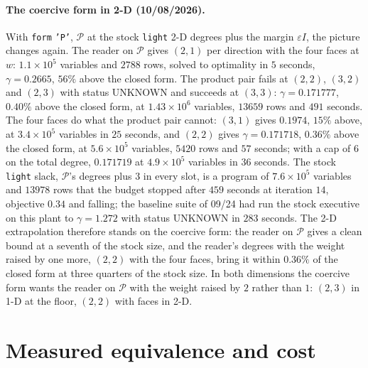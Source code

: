 \documentclass[12pt]{article}
\newcommand{\mcl}[1]{\mathcal{#1}}
\newcommand{\code}[1]{\texttt{#1}}
\theoremstyle{plain}
\theoremstyle{definition}
\theoremstyle{remark}
\begin{document}
\paragraph{The coercive form in 2-D (10/08/2026).} With \code{form} \code{'P'}, $\mcl P$ at the stock \code{light} 2-D degrees plus the margin $\varepsilon I$, the picture changes again. The reader on $\mcl P$ gives $(2,1)$ per direction with the four faces at $w$: $1.1\times10^{5}$ variables and $2788$ rows, solved to optimality in $5$ seconds, $\gamma=0.2665$, $56\%$ above the closed form. The product pair fails at $(2,2)$, $(3,2)$ and $(2,3)$ with status UNKNOWN and succeeds at $(3,3)$: $\gamma=0.171777$, $0.40\%$ above the closed form, at $1.43\times10^{6}$ variables, $13659$ rows and $491$ seconds. The four faces do what the product pair cannot: $(3,1)$ gives $0.1974$, $15\%$ above, at $3.4\times10^{5}$ variables in $25$ seconds, and $(2,2)$ gives $\gamma=0.171718$, $0.36\%$ above the closed form, at $5.6\times10^{5}$ variables, $5420$ rows and $57$ seconds; with a cap of $6$ on the total degree, $0.171719$ at $4.9\times10^{5}$ variables in $36$ seconds. The stock \code{light} slack, $\mcl P$'s degrees plus $3$ in every slot, is a program of $7.6\times10^{5}$ variables and $13978$ rows that the budget stopped after $459$ seconds at iteration $14$, objective $0.34$ and falling; the baseline suite of 09/24 had run the stock executive on this plant to $\gamma=1.272$ with status UNKNOWN in $283$ seconds. The 2-D extrapolation therefore stands on the coercive form: the reader on $\mcl P$ gives a clean bound at a seventh of the stock size, and the reader's degrees with the weight raised by one more, $(2,2)$ with the four faces, bring it within $0.36\%$ of the closed form at three quarters of the stock size. In both dimensions the coercive form wants the reader on $\mcl P$ with the weight raised by $2$ rather than $1$: $(2,3)$ in 1-D at the floor, $(2,2)$ with faces in 2-D.

\section{Measured equivalence and cost}\label{sec:measured}
\end{document}
